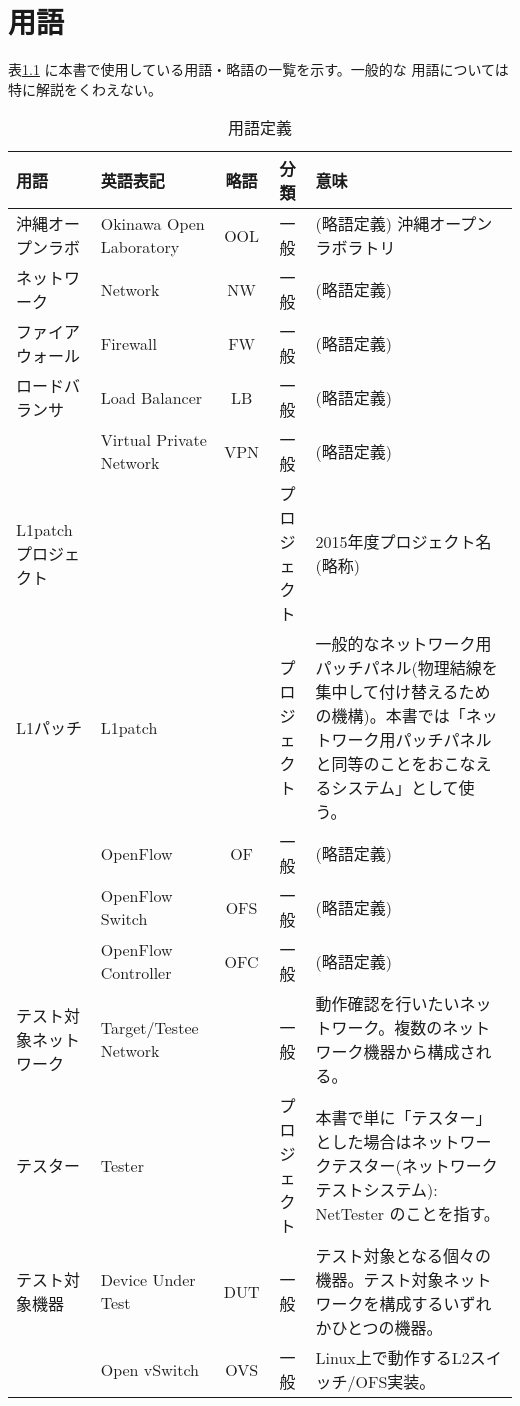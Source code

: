 
\chapter{用語}
\label{cpt:termdef}

表\ref{tbl:termdef} に本書で使用している用語・略語の一覧を示す。一般的な
用語については特に解説をくわえない。

 \begin{longtable}{p{8em}|p{8em}|c|c|p{16em}}
  \caption{用語定義}
  \label{tbl:termdef}
  \\
  \hline
  用語 & 英語表記 & 略語 & 分類 & 意味\\ \hline
  \hline
  \endhead
  沖縄オープンラボ & Okinawa Open Laboratory & OOL & 一般 & (略語定義) 沖縄オープンラボラトリ~\cite{ool-web} \\ \hline
  ネットワーク & Network & NW & 一般 & (略語定義) \\ \hline
  ファイアウォール & Firewall & FW & 一般 & (略語定義) \\ \hline
  ロードバランサ & Load Balancer & LB & 一般 & (略語定義) \\ \hline
  & Virtual Private Network & VPN & 一般 & (略語定義) \\ \hline
  L1patchプロジェクト & & & プロジェクト & 2015年度プロジェクト名(略称)~\cite{ool-l1pj-web} \\ \hline
  L1パッチ & L1patch & & プロジェクト & 一般的なネットワーク用パッチパネル(物理結線を集中して付け替えるための機構)。本書では「ネットワーク用パッチパネルと同等のことをおこなえるシステム」として使う。 \\ \hline
  & OpenFlow & OF & 一般 & (略語定義) \\ \hline
  & OpenFlow Switch & OFS & 一般 & (略語定義) \\ \hline
  & OpenFlow Controller & OFC & 一般 & (略語定義) \\ \hline
  テスト対象ネットワーク & Target/Testee Network & & 一般 & 動作確認を行いたいネットワーク。複数のネットワーク機器から構成される。\\ \hline
  テスター & Tester & & プロジェクト & 本書で単に「テスター」とした場合はネットワークテスター(ネットワークテストシステム): NetTester のことを指す。\\ \hline
  テスト対象機器 & Device Under Test & DUT & 一般 & テスト対象となる個々の機器。テスト対象ネットワークを構成するいずれかひとつの機器。\\ \hline
  & Open vSwitch & OVS & 一般 & Linux上で動作するL2スイッチ/OFS実装。 \\ \hline

\end{longtable}
